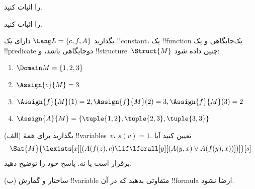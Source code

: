 \documentclass[../../../include/open-logic-section]{subfiles}
\begin{document}

\begin{prob}
   را اثبات کنید.
\end{prob}
\tagendprob


\begin{prob}
   را اثبات کنید.
\end{prob}
\tagendprob

\begin{prob}
بگذارید $\Lang L = \{c, f, A\}$ دارای یک !!{constant}، یک !!{function}
یک‌جایگاهی و یک !!{predicate} دوجایگاهی باشد، و !!{structure}~$\Struct{M}$
چنین داده شود:
\begin{enumerate}
\item $\Domain M = \{1, 2, 3\}$
\item $\Assign{c}{M} = 3$
\item $\Assign{f}{M}(1) = 2, \Assign{f}{M}(2) = 3, \Assign{f}{M}(3) = 2$
\item $\Assign{A}{M} = \{\tuple{1, 2}, \tuple{2, 3}, \tuple{3, 3}\}$
\end{enumerate}
(الف) بگذارید برای همهٔ !!{variable}s~$v$، $s(v) = 1$. تعیین کنید آیا
\[
\Sat{M}{\lexists[x][(A(f(z), c) \lif \lforall[y][(A(y, x) \lor A(f(y),
      x))])]}[s]
\]
برقرار است یا نه. پاسخ خود را توضیح دهید.

(ب) ساختار و گمارش !!{variable} متفاوتی بدهید که در آن !!{formula} ارضا
نشود.
\end{prob}
\end{document}

